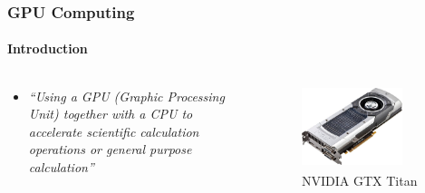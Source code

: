 \begin{frame}
    \frametitle{GPU Computing}
    \framesubtitle{Introduction}

    \begin{columns}
        \begin{column}{0.5\textwidth}
            \begin{itemize}
                \item \emph{``Using a GPU (Graphic Processing Unit) together with
                      a CPU to accelerate scientific calculation operations
                      or general purpose calculation''}
            \end{itemize}
        \end{column}
        \begin{column}{0.5\textwidth}
             \begin{figure}
                 \centering
                 \includegraphics[width=0.8\textwidth]{img/titan}
                 \caption{NVIDIA\textsuperscript{\textregistered} GTX Titan}
                 \label{fig:titan}
             \end{figure}
        \end{column}
    \end{columns}
\end{frame}


